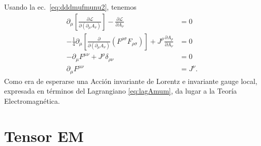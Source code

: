 \begin{frame}

Usando la ec.~\eqref{eq:dddmufmunu2}, tenemos
\begin{align}
\label{eq:177qft}
  \partial_\mu\left[
    \frac{\partial\mathcal{L}}{\partial(\partial_\mu A_\nu)}  
  \right]-\frac{\partial\mathcal{L}}{\partial A_\nu}&=0\nonumber\\
  -\frac{1}{4}\partial_\mu\left[
    \frac{\partial}{\partial(\partial_\mu A_\nu)}(F^{\rho\sigma}F_{\rho\sigma})  
  \right]+J^\rho\frac{\partial A_\rho}{\partial A_\nu}&=0\nonumber\\
  -\partial_\mu F^{\mu\nu}+J^\rho\delta_{\rho\nu}&=0\nonumber\\
  \partial_\mu F^{\mu\nu}&=J^\nu.
\end{align}
Como era de esperarse una Acción invariante de Lorentz e invariante
gauge local, expresada en términos del Lagrangiano \eqref{eq:lagAmum},
da lugar a la Teoría Electromagnética. 
\end{frame}


\section{Tensor EM}


